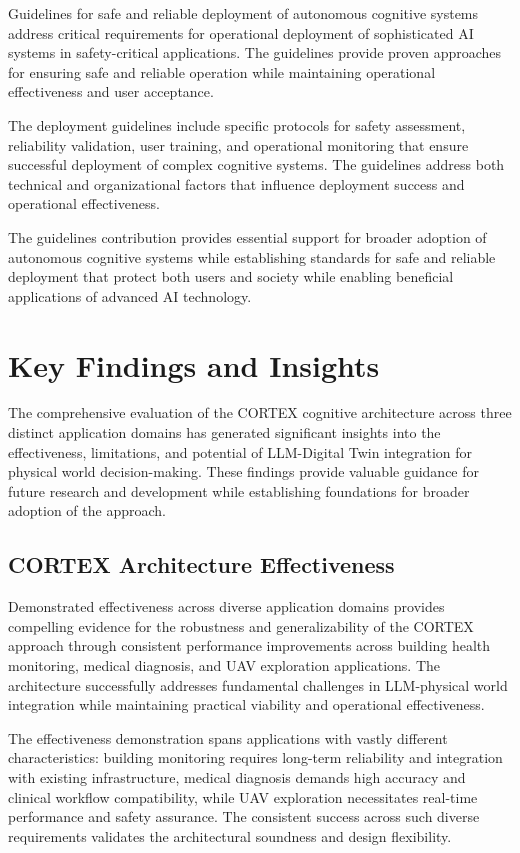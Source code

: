 Guidelines for safe and reliable deployment of autonomous cognitive systems address critical requirements for operational deployment of sophisticated AI systems in safety-critical applications. The guidelines provide proven approaches for ensuring safe and reliable operation while maintaining operational effectiveness and user acceptance.

The deployment guidelines include specific protocols for safety assessment, reliability validation, user training, and operational monitoring that ensure successful deployment of complex cognitive systems. The guidelines address both technical and organizational factors that influence deployment success and operational effectiveness.

The guidelines contribution provides essential support for broader adoption of autonomous cognitive systems while establishing standards for safe and reliable deployment that protect both users and society while enabling beneficial applications of advanced AI technology.

\section{Key Findings and Insights}

The comprehensive evaluation of the CORTEX cognitive architecture across three distinct application domains has generated significant insights into the effectiveness, limitations, and potential of LLM-Digital Twin integration for physical world decision-making. These findings provide valuable guidance for future research and development while establishing foundations for broader adoption of the approach.

\subsection{CORTEX Architecture Effectiveness}

Demonstrated effectiveness across diverse application domains provides compelling evidence for the robustness and generalizability of the CORTEX approach through consistent performance improvements across building health monitoring, medical diagnosis, and UAV exploration applications. The architecture successfully addresses fundamental challenges in LLM-physical world integration while maintaining practical viability and operational effectiveness.

The effectiveness demonstration spans applications with vastly different characteristics: building monitoring requires long-term reliability and integration with existing infrastructure, medical diagnosis demands high accuracy and clinical workflow compatibility, while UAV exploration necessitates real-time performance and safety assurance. The consistent success across such diverse requirements validates the architectural soundness and design flexibility.

